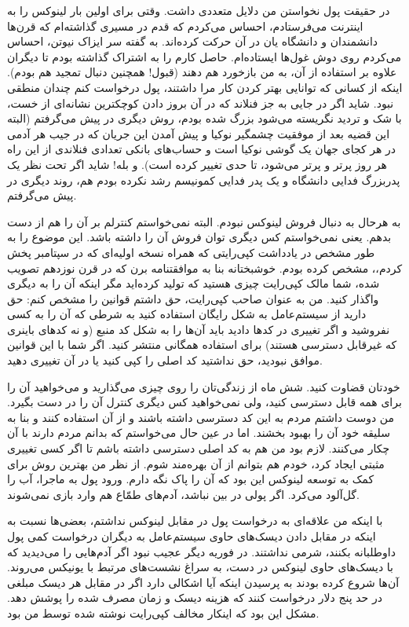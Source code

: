 در حقیقت پول نخواستن من دلایل متعددی داشت. وقتی برای اولین بار لینوکس
را به اینترنت می‌فرستادم، احساس می‌کردم که قدم در مسیری گذاشته‌ام که
قرن‌ها دانشمندان و دانشگاه یان در آن حرکت کرده‌اند. به گفته سر ایزاک
نیوتن، احساس می‌کردم روی دوش غول‌ها ایستاده‌ام. حاصل کارم را به اشتراک
گذاشته بودم تا دیگران علاوه بر استفاده از آن، به من بازخورد هم دهند
(قبول! همچنین دنبال تمجید هم بودم). اینکه از کسانی که توانایی بهتر
کردن کار مرا داشتند، پول درخواست کنم چندان منطقی نبود. شاید اگر در
جایی به جز فنلاند که در آن بروز دادن کوچکترین نشانه‌ای از خست، با شک و
تردید نگریسته می‌شود بزرگ شده بودم، روش دیگری در پیش می‌گرفتم (البته این
قضیه بعد از موفقیت چشمگیر نوکیا و پیش آمدن این جریان که در جیب هر آدمی
در هر کجای جهان یک گوشی نوکیا است و حساب‌های بانکی تعدادی فنلاندی از
این راه هر روز پرتر و پرتر می‌شود، تا حدی تغییر کرده است). و بله! شاید
اگر تحت نظر یک پدربزرگ فدایی دانشگاه و یک پدر فدایی کمونیسم رشد نکرده
بودم هم، روند دیگری در پیش می‌گرفتم.

به هرحال به دنبال فروش لینوکس نبودم. البته نمی‌خواستم کنترلم بر آن‌ را
هم از دست بدهم. یعنی نمی‌خواستم کس دیگری توان فروش آن را داشته
باشد. این موضوع را به طور مشخص در یادداشت کپی‌رایتی که همراه نسخه‌
اولیه‌ای که در سپتامبر پخش کردم،، مشخص کرده‌ بودم. خوشبختانه بنا به
موافقتنامه برن که در قرن نوزدهم تصویب شده، شما مالک کپی‌رایت چیزی هستید
که تولید کرده‌اید مگر اینکه آن را به دیگری واگذار کنید. من به عنوان
صاحب کپی‌رایت، حق داشتم قوانین را مشخص کنم: حق دارید از سیستم‌عامل به
شکل رایگان استفاده کنید به شرطی که آن را به کسی نفروشید و اگر تغییری
در کدها دادید باید آن‌ها را به شکل کد منبع (و نه کدهای باینری که
غیرقابل دسترسی هستند) برای استفاده همگانی منتشر کنید. اگر شما با این
قوانین موافق نبودید، حق نداشتید کد اصلی را کپی کنید یا در آن تغییری
دهید.

خودتان قضاوت کنید. شش ماه از زندگی‌تان را روی چیزی می‌گذارید و می‌خواهید
آن را برای همه قابل دسترسی کنید، ولی نمی‌خواهید کس دیگری کنترل آن را در
دست بگیرد. من دوست داشتم مردم به این کد دسترسی داشته باشند و از آن
استفاده کنند و بنا به سلیقه خود آن را بهبود بخشند. اما در عین حال
می‌خواستم که بدانم مردم دارند با آن چکار می‌کنند. لازم بود من هم به کد
اصلی دسترسی داشته باشم تا اگر کسی تغییری مثبتی ایجاد کرد، خودم هم
بتوانم از آن بهره‌مند شوم. از نظر من بهترین روش برای کمک به توسعه
لینوکس این بود که آن را پاک نگه دارم. ورود پول به ماجرا، آب را گل‌آلود
می‌کرد. اگر پولی در بین نباشد، آدم‌های طمّاع هم وارد بازی نمی‌شوند.

با اینکه من علاقه‌ای به درخواست پول در مقابل لینوکس نداشتم، بعضی‌ها نسبت
به اینکه در مقابل دادن دیسک‌های حاوی سیستم‌عامل به دیگران درخواست کمی
پول داوطلبانه بکنند، شرمی نداشتند. در فوریه دیگر عجیب نبود اگر آدم‌هایی
را می‌دیدید که با دیسک‌های حاوی لینوکس در دست، به سراغ نشست‌های مرتبط با
یونیکس می‌روند. آن‌ها شروع کرده بودند به پرسیدن اینکه آیا اشکالی دارد
اگر در مقابل هر دیسک مبلغی در حد پنج دلار درخواست کنند که هزینه دیسک و
زمان مصرف شده را پوشش دهد. مشکل این بود که اینکار مخالف کپی‌رایت نوشته
شده توسط من بود.

